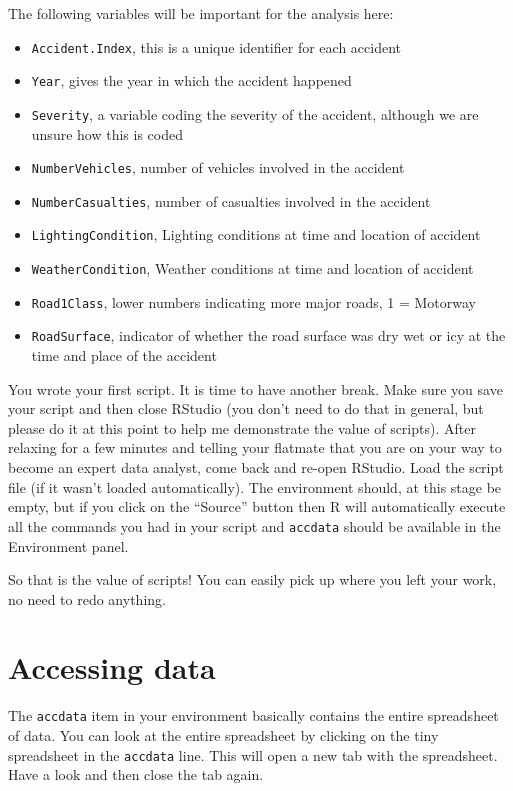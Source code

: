 \documentclass[
]{article}
\providecommand{\tightlist}{%
  \setlength{\itemsep}{0pt}\setlength{\parskip}{0pt}}
\begin{document}
The following variables will be important for the analysis here:

\begin{itemize}
\tightlist
\item
  \texttt{Accident.Index}, this is a unique identifier for each accident
\item
  \texttt{Year}, gives the year in which the accident happened
\item
  \texttt{Severity}, a variable coding the severity of the accident,
  although we are unsure how this is coded
\item
  \texttt{NumberVehicles}, number of vehicles involved in the accident
\item
  \texttt{NumberCasualties}, number of casualties involved in the
  accident
\item
  \texttt{LightingCondition}, Lighting conditions at time and location
  of accident
\item
  \texttt{WeatherCondition}, Weather conditions at time and location of
  accident
\item
  \texttt{Road1Class}, lower numbers indicating more major roads, 1 =
  Motorway
\item
  \texttt{RoadSurface}, indicator of whether the road surface was dry
  wet or icy at the time and place of the accident
\end{itemize}

You wrote your first script. It is time to have another break. Make sure
you save your script and then close RStudio (you don't need to do that
in general, but please do it at this point to help me demonstrate the
value of scripts). After relaxing for a few minutes and telling your
flatmate that you are on your way to become an expert data analyst, come
back and re-open RStudio. Load the script file (if it wasn't loaded
automatically). The environment should, at this stage be empty, but if
you click on the ``Source'' button then R will automatically execute all
the commands you had in your script and \texttt{accdata} should be
available in the Environment panel.

So that is the value of scripts! You can easily pick up where you left
your work, no need to redo anything.

\hypertarget{accessing-data}{%
\section{Accessing data}\label{accessing-data}}

The \texttt{accdata} item in your environment basically contains the
entire spreadsheet of data. You can look at the entire spreadsheet by
clicking on the tiny spreadsheet in the \texttt{accdata} line. This will
open a new tab with the spreadsheet. Have a look and then close the tab
again.
\end{document}
